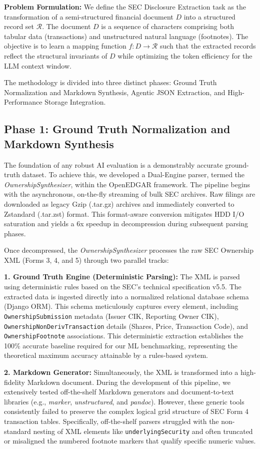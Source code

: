 \documentclass[journal, onecolumn]{IEEEtran}
\begin{document}
\textbf{Problem Formulation:}
We define the SEC Disclosure Extraction task as the transformation of a semi-structured financial document $D$ into a structured record set $\mathcal{R}$. The document $D$ is a sequence of characters comprising both tabular data (transactions) and unstructured natural language (footnotes). The objective is to learn a mapping function $f: D \to \mathcal{R}$ such that the extracted records reflect the structural invariants of $D$ while optimizing the token efficiency for the LLM context window.

The methodology is divided into three distinct phases: Ground Truth Normalization and Markdown Synthesis, Agentic JSON Extraction, and High-Performance Storage Integration.

\subsection{Phase 1: Ground Truth Normalization and Markdown Synthesis}
The foundation of any robust AI evaluation is a demonstrably accurate ground-truth dataset. To achieve this, we developed a Dual-Engine parser, termed the \textit{OwnershipSynthesizer}, within the OpenEDGAR framework. The pipeline begins with the asynchronous, on-the-fly streaming of bulk SEC archives. Raw filings are downloaded as legacy Gzip (.tar.gz) archives and immediately converted to Zstandard (.tar.zst) format. This format-aware conversion mitigates HDD I/O saturation and yields a 6x speedup in decompression during subsequent parsing phases.

Once decompressed, the \textit{OwnershipSynthesizer} processes the raw SEC Ownership XML (Forms 3, 4, and 5) through two parallel tracks:

\textbf{1. Ground Truth Engine (Deterministic Parsing):}
The XML is parsed using deterministic rules based on the SEC's technical specification v5.5. The extracted data is ingested directly into a normalized relational database schema (Django ORM). This schema meticulously captures every element, including \texttt{OwnershipSubmission} metadata (Issuer CIK, Reporting Owner CIK), \texttt{OwnershipNonDerivTransaction} details (Shares, Price, Transaction Code), and \texttt{OwnershipFootnote} associations. This deterministic extraction establishes the 100\% accurate baseline required for our ML benchmarking, representing the theoretical maximum accuracy attainable by a rules-based system.

\textbf{2. Markdown Generator:}
Simultaneously, the XML is transformed into a high-fidelity Markdown document. During the development of this pipeline, we extensively tested off-the-shelf Markdown generators and document-to-text libraries (e.g., \textit{marker}, \textit{unstructured}, and \textit{pandoc}). However, these generic tools consistently failed to preserve the complex logical grid structure of SEC Form 4 transaction tables. Specifically, off-the-shelf parsers struggled with the non-standard nesting of XML elements like \texttt{underlyingSecurity} and often truncated or misaligned the numbered footnote markers that qualify specific numeric values. 
\end{document}
